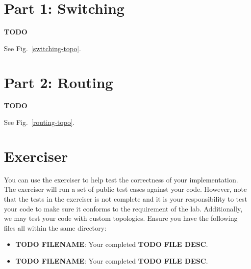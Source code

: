 \documentclass[11pt]{article}
\begin{document}

\section{Part 1: Switching}
\label{sec:exercise}
\textbf{TODO}

See Fig.~\ref{switching-topo}.


\section{Part 2: Routing}
\label{sec:exercise}
\textbf{TODO}

See Fig.~\ref{routing-topo}.


\section{Exerciser}
\label{sec:exercise}
You can use the exerciser to help test the correctness of your implementation.
The exerciser will run a set of public test cases against your code.
However, note that the tests in the exerciser is not complete and it is your responsibility to test your code to make sure it conforms to the requirement of the lab.
Additionally, we may test your code with custom topologies.
Ensure you have the following files all within the same directory:
\begin{itemize}
    \item \textbf{TODO FILENAME}: Your completed \textbf{TODO FILE DESC}.
    \item \textbf{TODO FILENAME}: Your completed \textbf{TODO FILE DESC}.
\end{itemize}
\end{document}

